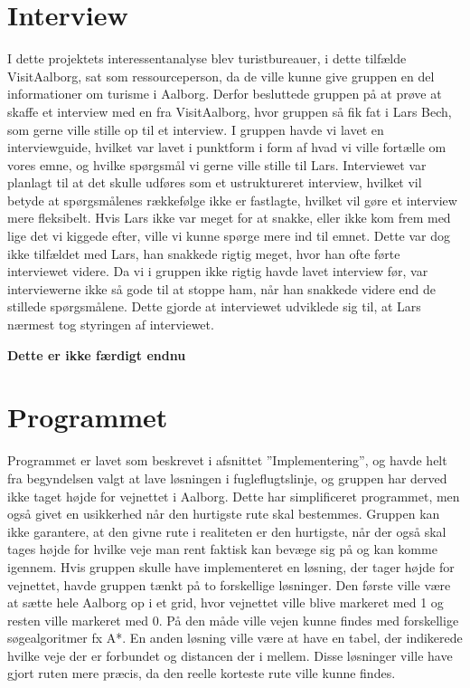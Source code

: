 \section{Interview}
I dette projektets interessentanalyse blev turistbureauer, i dette tilfælde VisitAalborg, sat som ressourceperson, da de ville kunne give gruppen en del informationer om turisme i Aalborg. Derfor besluttede gruppen på at prøve at skaffe et interview med en fra VisitAalborg, hvor gruppen så fik fat i Lars Bech, som gerne ville stille op til et interview. I gruppen havde vi lavet en interviewguide, hvilket var lavet i punktform i form af hvad vi ville fortælle om vores emne, og hvilke spørgsmål vi gerne ville stille til Lars. Interviewet var planlagt til at det skulle udføres som et ustruktureret interview, hvilket vil betyde at spørgsmålenes rækkefølge ikke er fastlagte, hvilket vil gøre et interview mere fleksibelt. Hvis Lars ikke var meget for at snakke, eller ikke kom frem med lige det vi kiggede efter, ville vi kunne spørge mere ind til emnet. Dette var dog ikke tilfældet med Lars, han snakkede rigtig meget, hvor han ofte førte interviewet videre. Da vi i gruppen ikke rigtig havde lavet interview før, var interviewerne ikke så gode til at stoppe ham, når han snakkede videre end de stillede spørgsmålene. Dette gjorde at interviewet udviklede sig til, at Lars nærmest tog styringen af interviewet.

\textbf{Dette er ikke færdigt endnu}
\section{Programmet}
Programmet er lavet som beskrevet i afsnittet ”Implementering”, og havde helt fra begyndelsen valgt at lave løsningen i fugleflugtslinje, og gruppen har derved ikke taget højde for vejnettet i Aalborg. Dette har simplificeret programmet, men også givet en usikkerhed når den hurtigste rute skal bestemmes. Gruppen kan ikke garantere, at den givne rute i realiteten er den hurtigste, når der også skal tages højde for hvilke veje man rent faktisk kan bevæge sig på og kan komme igennem. 
Hvis gruppen skulle have implementeret en løsning, der tager højde for vejnettet, havde gruppen tænkt på to forskellige løsninger. Den første ville være at sætte hele Aalborg op i et grid, hvor vejnettet ville blive markeret med 1 og resten ville markeret med 0. På den måde ville vejen kunne findes med forskellige søgealgoritmer fx A*. En anden løsning ville være at have en tabel, der indikerede hvilke veje der er forbundet og distancen der i mellem. Disse løsninger ville have gjort ruten mere præcis, da den reelle korteste rute ville kunne findes. 
